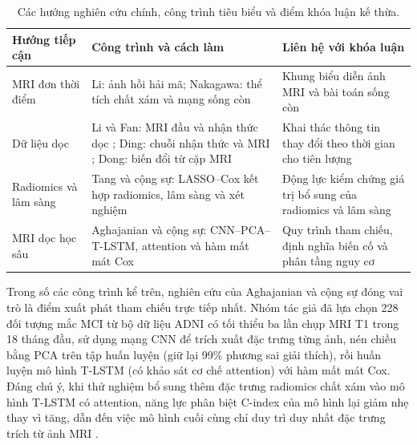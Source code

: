 \begin{table}[H]
\centering\small
\renewcommand{\arraystretch}{1.02}
\caption[Tổng hợp nghiên cứu liên quan]{Các hướng nghiên cứu chính, công trình tiêu biểu và điểm khóa luận kế thừa.}
\label{tab:related}
\begin{tabularx}{\linewidth}{@{}L{2.8cm}Y Y@{}}
\toprule
\textbf{Hướng tiếp cận} & \textbf{Công trình và cách làm} & \textbf{Liên hệ với khóa luận} \\
\midrule
MRI đơn thời điểm & Li: ảnh hồi hải mã; Nakagawa: thể tích chất xám và mạng sống còn \cite{li2019hippocampal,nakagawa2020survival} & Khung biểu diễn ảnh MRI và bài toán sống còn \\
Dữ liệu dọc & Li và Fan: MRI đầu và nhận thức dọc \cite{li2019early}; Ding: chuỗi nhận thức và MRI \cite{ding2023progression}; Dong: biến đổi từ cặp MRI \cite{dong2021deepatrophy} & Khai thác thông tin thay đổi theo thời gian cho tiên lượng \\
Radiomics và lâm sàng & Tang và cộng sự: LASSO--Cox kết hợp radiomics, lâm sàng và xét nghiệm \cite{tang2021individualized} & Động lực kiểm chứng giá trị bổ sung của radiomics và lâm sàng \\
MRI dọc học sâu & Aghajanian và cộng sự: CNN--PCA--T-LSTM, attention và hàm mất mát Cox \cite{aghajanian2025longitudinal} & Quy trình tham chiếu, định nghĩa biến cố và phân tầng nguy cơ \\
\bottomrule
\end{tabularx}
\end{table}

Trong số các công trình kể trên, nghiên cứu của Aghajanian và cộng sự \cite{aghajanian2025longitudinal} đóng vai trò là điểm xuất phát tham chiếu trực tiếp nhất. Nhóm tác giả đã lựa chọn 228 đối tượng mắc MCI từ bộ dữ liệu ADNI có tối thiểu ba lần chụp MRI T1 trong 18 tháng đầu, sử dụng mạng CNN để trích xuất đặc trưng từng ảnh, nén chiều bằng PCA trên tập huấn luyện (giữ lại 99\% phương sai giải thích), rồi huấn luyện mô hình T-LSTM (có khảo sát cơ chế attention) với hàm mất mát Cox. Đáng chú ý, khi thử nghiệm bổ sung thêm đặc trưng radiomics chất xám vào mô hình T-LSTM có attention, năng lực phân biệt C-index của mô hình lại giảm nhẹ thay vì tăng, dẫn đến việc mô hình cuối cùng chỉ duy trì duy nhất đặc trưng trích từ ảnh MRI \cite{aghajanian2025longitudinal}.

